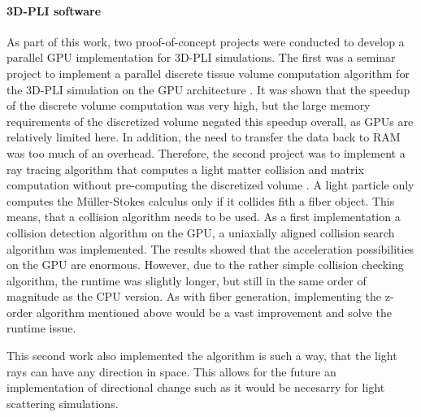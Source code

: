 \paragraph{\ac{3D-PLI} software}
% 
As part of this work, two proof-of-concept projects were conducted to develop a parallel GPU implementation for \ac{3D-PLI} simulations.
The first was a seminar project to implement a parallel discrete tissue volume computation algorithm for the \ac{3D-PLI} simulation on the \ac{GPU} architecture \cite{Kobusch:Seminar}.
It was shown that the speedup of the discrete volume computation was very high, but the large memory requirements of the discretized volume negated this speedup overall, as \acp{GPU} are relatively limited here.
In addition, the need to transfer the data back to \ac{RAM} was too much of an overhead.
Therefore, the second project was to implement a ray tracing algorithm that computes a light matter collision and matrix computation without pre-computing the discretized volume \cite{Kobusch:887783, GPUfastpli}.
A light particle only computes the M\"{u}ller-Stokes calculus only if it collides fith a fiber object.
This means, that a collision algorithm needs to be used.
As a first implementation a collision detection algorithm on the \ac{GPU}, a uniaxially aligned collision search algorithm \cite{Karras2012} was implemented.
The results showed that the acceleration possibilities on the \ac{GPU} are enormous.
However, due to the rather simple collision checking algorithm, the runtime was slightly longer, but still in the same order of magnitude as the \ac{CPU} version.
As with fiber generation, implementing the z-order algorithm mentioned above \cite{Karras2012} would be a vast improvement and solve the runtime issue.
%
\par
This second work also implemented the algorithm is such a way, that the light rays can have any direction in space.
This allows for the future an implementation of directional change such as it would be necesarry for light scattering simulations.
% 
% 
% 
